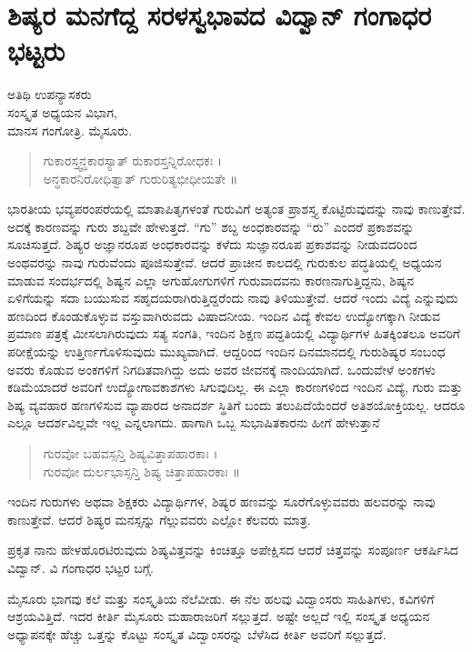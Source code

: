 \chapter{ಶಿಷ್ಯರ ಮನಗೆದ್ದ ಸರಳಸ್ವಭಾವದ ವಿದ್ವಾನ್ ಗಂಗಾಧರ ಭಟ್ಟರು}

\begin{center}
\smallskip
ಅತಿಥಿ ಉಪನ್ಯಾಸಕರು\\
ಸಂಸ್ಕೃತ ಅಧ್ಯಯನ ವಿಭಾಗ,\\
ಮಾನಸ ಗಂಗೋತ್ರಿ. ಮೈಸೂರು.
\addrule
\end{center}
\begin{verse}
ಗುಕಾರಸ್ತ್ವನ್ಧಕಾರಸ್ಯಾತ್ ರುಕಾರಸ್ತನ್ನಿರೋಧಕಃ ।\\
ಅನ್ಧಕಾರನಿರೋಧಿತ್ವಾತ್ ಗುರುರಿತ್ಯಭೀಧೀಯತೇ ॥
\end{verse}
ಭಾರತೀಯ ಭವ್ಯಪರಂಪರೆಯಲ್ಲಿ ಮಾತಾಪಿತೃಗಳಂತೆ ಗುರುವಿಗೆ ಅತ್ಯಂತ ಪ್ರಾಶಸ್ತ್ಯ ಕೊಟ್ಟಿರುವುದನ್ನು ನಾವು ಕಾಣುತ್ತೇವೆ. ಅದಕ್ಕೆ ಕಾರಣವನ್ನು ಗುರು ಶಬ್ದವೇ ಹೇಳುತ್ತದೆ. “ಗು” ಶಬ್ದ ಅಂಧಕಾರವನ್ನು “ರು” ಎಂದರೆ ಪ್ರಕಾಶವನ್ನು ಸೂಚಿಸುತ್ತದೆ. ಶಿಷ್ಯರ ಅಜ್ಞಾನರೂಪ ಅಂಧಕಾರವನ್ನು ಕಳೆದು ಸುಜ್ಞಾನರೂಪ ಪ್ರಕಾಶವನ್ನು ನೀಡುವದರಿಂದ ಅಂಥವರನ್ನು ನಾವು ಗುರುವೆಂದು ಪೂಜಿಸುತ್ತೇವೆ. ಆದರೆ ಪ್ರಾಚೀನ ಕಾಲದಲ್ಲಿ ಗುರುಕುಲ ಪದ್ಧತಿಯಲ್ಲಿ ಅಧ್ಯಯನ ಮಾಡುವ ಸಂದರ್ಭದಲ್ಲಿ ಶಿಷ್ಯನ ಎಲ್ಲಾ ಅಗುಹೋಗುಗಳಿಗೆ ಗುರುವಾದವನು ಕಾರಣನಾಗುತ್ತಿದ್ದನು, ಶಿಷ್ಯನ ಏಳಿಗೆಯನ್ನು ಸದಾ ಬಯುಸುವ ಸಹೃದಯರಾಗಿರುತ್ತಿದ್ದರೆಂದು ನಾವು ತಿಳಿಯುತ್ತೇವೆ. ಆದರೆ ಇಂದು ವಿದ್ಯೆ ಎನ್ನುವುದು ಹಣದಿಂದ ಕೊಂಡುಕೊಳ್ಳುವ ವಸ್ತುವಾಗಿರುವದು ವಿಷಾದನೀಯ. ಇಂದಿನ ವಿದ್ಯೆ ಕೇವಲ ಉದ್ಯೋಗಕ್ಕಾಗಿ ನೀಡುವ ಪ್ರಮಾಣ ಪತ್ರಕ್ಕೆ ಮೀಸಲಾಗಿರುವುದು ಸತ್ಯ ಸಂಗತಿ, ಇಂದಿನ ಶಿಕ್ಷಣ ಪದ್ದತಿಯಲ್ಲಿ ವಿದ್ಯಾರ್ಥಿಗಳ ಹಿತಕ್ಕಿಂತಲೂ ಅವರಿಗೆ ಪರೀಕ್ಷೆಯನ್ನು ಉತ್ತಿರ್ಣಗೊಳಿಸುವುದು ಮುಖ್ಯವಾಗಿದೆ. ಆದ್ದರಿಂದ ಇಂದಿನ ದಿನಮಾನದಲ್ಲಿ ಗುರುಶಿಷ್ಯರ ಸಂಬಂಧ ಅವರು ಕೊಡುವ ಅಂಕಗಳಿಗೆ ನಿಗದಿತವಾಗಿದ್ದು ಅದು ಅವರ ಜೀವನಕ್ಕೆ ನಾಂದಿಯಾಗಿದೆ. ಒಂದುವೇಳೆ ಅಂಕಗಳು ಕಡಿಮೆಯಾದರೆ ಅವರಿಗೆ ಉದ್ಯೋಗಾವಕಾಶಗಳು ಸಿಗುವುದಿಲ್ಲ. ಈ ಎಲ್ಲಾ ಕಾರಣಗಳಿಂದ ಇಂದಿನ ವಿದ್ಯೆ, ಗುರು ಮತ್ತು ಶಿಷ್ಯ ವ್ಯವಹಾರ ಹಣಗಳಿಸುವ ವ್ಯಾಪಾರದ ಅನಾದರ್ಶ ಸ್ಥಿತಿಗೆ ಬಂದು ತಲುಪಿದೆಯೆಂದರೆ ಅತಿಶಯೋಕ್ತಿಯಲ್ಲ. ಆದರೂ ಎಲ್ಲೂ ಆದರ್ಶವಿಲ್ಲವೇ ಇಲ್ಲ ಎನ್ನಲಾಗದು. ಹಾಗಾಗಿ ಒಬ್ಬ ಸುಭಾಷಿತಕಾರನು ಹೀಗೆ ಹೇಳುತ್ತಾನೆ 
\begin{verse}
ಗುರವೋ ಬಹವಸ್ಸನ್ತಿ ಶಿಷ್ಯವಿತ್ತಾಪಹಾರಕಾಃ ।\\
ಗುರವೋ ದುರ್ಲಭಾಸ್ಸನ್ತಿ ಶಿಷ್ಯ ಚಿತ್ತಾಪಹಾರಕಾಃ ॥
\end{verse}
ಇಂದಿನ ಗುರುಗಳು ಅಥವಾ ಶಿಕ್ಷಕರು ವಿದ್ಯಾರ್ಥಿಗಳ, ಶಿಷ್ಯರ ಹಣವನ್ನು ಸೂರೆಗೊಳ್ಳುವವರು ಹಲವರನ್ನು ನಾವು ಕಾಣುತ್ತೇವೆ. ಆದರೆ ಶಿಷ್ಯರ ಮನಸ್ಸನ್ನು ಗೆಲ್ಲುವವರು ಎಲ್ಲೋ ಕೆಲವರು ಮಾತ್ರ.

ಪ್ರಕೃತ ನಾನು ಹೇಳಹೊರಟಿರುವುದು ಶಿಷ್ಯವಿತ್ತವನ್ನು ಕಿಂಚಿತ್ತೂ ಅಪೇಕ್ಷಿಸದ ಆದರೆ ಚಿತ್ತವನ್ನು ಸಂಪೂರ್ಣ ಆಕರ್ಷಿಸಿದ ವಿದ್ವಾನ್. ವಿ ಗಂಗಾಧರ ಭಟ್ಟರ ಬಗ್ಗೆ.

ಮೈಸೂರು ಭಾಗವು ಕಲೆ ಮತ್ತು ಸಂಸ್ಕೃತಿಯ ನೆಲೆವೀಡು. ಈ ನೆಲ ಹಲವು ವಿದ್ವಾಂಸರು ಸಾಹಿತಿಗಳು, ಕವಿಗಳಿಗೆ ಆಶ್ರಯವಿತ್ತಿದೆ. ಇದರ ಕೀರ್ತಿ ಮೈಸೂರು ಮಹಾರಾಜರಿಗೆ ಸಲ್ಲುತ್ತದೆ. ಅಷ್ಟೇ ಅಲ್ಲದೆ ಇಲ್ಲಿ ಸಂಸ್ಕೃತ ಅಧ್ಯಯನ ಅಧ್ಯಾಪನಕ್ಕೇ ಹೆಚ್ಚು ಒತ್ತನ್ನು ಕೊಟ್ಟು ಸಂಸ್ಕೃತ ವಿದ್ವಾಂಸರನ್ನು ಬೆಳೆಸಿದ ಕೀರ್ತಿ ಅವರಿಗೆ ಸಲ್ಲುತ್ತದೆ.

